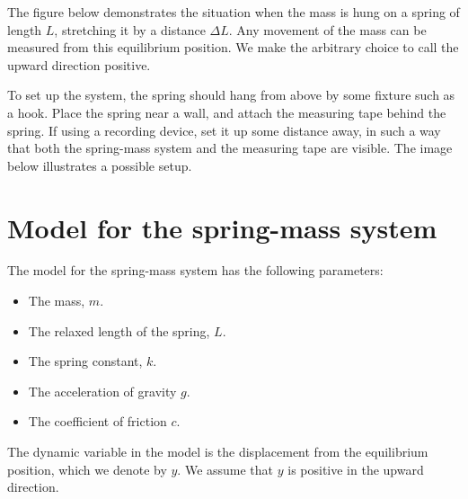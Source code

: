 \documentclass{ximera}
\begin{document}
The figure below demonstrates the situation when the mass is hung on a spring of length $L$, stretching it by a distance $\Delta L$.   Any movement of the mass can be measured from this equilibrium position.  We make the arbitrary choice to call the upward direction positive.  

\begin{center}
\end{center}
To set up the system, the spring should hang from above by some fixture such as a hook. Place the spring near a wall, and attach the measuring tape behind the spring. If using a recording device, set it up some distance away, in such a way that both the spring-mass system and the measuring tape are visible. The image below illustrates a possible setup.

\section{Model for the spring-mass system}

The model for the spring-mass system has the following parameters:
\begin{itemize}
    \item The mass, $m$.
    \item The relaxed length of the spring, $L$.
    \item The spring constant, $k$.
    \item The acceleration of gravity $g$.
    \item The coefficient of friction $c$.
\end{itemize}
The dynamic variable in the model is the displacement from the equilibrium position, which we denote by $y$. We assume that $y$ is positive in the upward direction.
\end{document}
